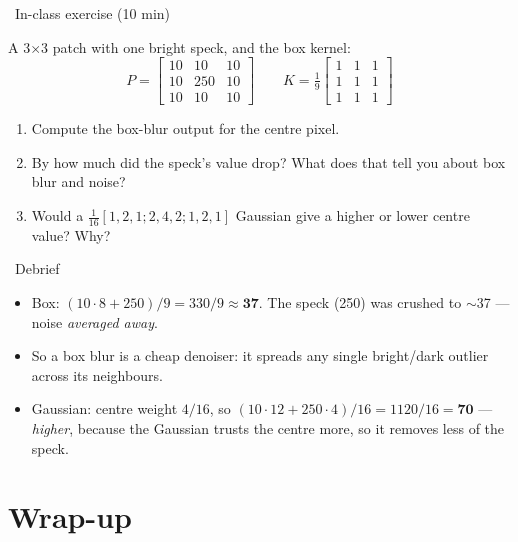 \documentclass[10pt,aspectratio=169]{beamer}
\begin{document}
\begin{frame}[fragile]{\faPen~In-class exercise (10 min)}
  \begin{infobox}
  \end{infobox}
  A 3$\times$3 patch with one bright speck, and the box kernel:
  \[
  P=\begin{bmatrix}10&10&10\\10&250&10\\10&10&10\end{bmatrix}\qquad
  K=\tfrac{1}{9}\begin{bmatrix}1&1&1\\1&1&1\\1&1&1\end{bmatrix}
  \]
  \begin{enumerate}
    \item Compute the box-blur output for the centre pixel.
    \item By how much did the speck's value drop? What does that tell you about box blur and noise?
    \item Would a $\tfrac{1}{16}[1,2,1;2,4,2;1,2,1]$ Gaussian give a higher or lower centre value? Why?
  \end{enumerate}
\end{frame}

\begin{frame}{\faPen~Debrief}
  \begin{itemize}
    \item Box: $(10{\cdot}8 + 250)/9 = 330/9 \approx \mathbf{37}$. The speck (250) was crushed to $\sim$37 — noise \emph{averaged away}.
    \item So a box blur is a cheap denoiser: it spreads any single bright/dark outlier across its neighbours.
    \item Gaussian: centre weight $4/16$, so $(10{\cdot}12 + 250{\cdot}4)/16 = 1120/16 = \mathbf{70}$ — \emph{higher},
          because the Gaussian trusts the centre more, so it removes less of the speck.
  \end{itemize}
\end{frame}

\section{Wrap-up}
\end{document}
